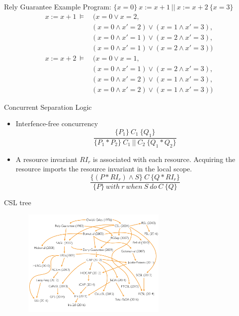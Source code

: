 \documentclass[11pt]{beamer}
\begin{document}
\begin{frame}{Rely Guarantee Example}
 Program: $\{x = 0\}~ x := x + 1 ~||~ x := x + 2 ~\{x = 3\}$ \\
    \pause
  \begin{equation}
    \begin{split}
      x := x + 1 ~\models &~(x = 0 \lor x = 2, \\
      &(x = 0 \land x' = 2) \lor (x = 1 \land x' = 3), \\
      &(x = 0 \land x'=1) \lor (x=2 \land x' = 3), \\
      &(x = 0 \land x' = 1) \lor (x = 2 \land x' = 3)) \nonumber
  \end{split}
  \end{equation}
  \pause
  \begin{equation}
    \begin{split}
      x := x + 2 ~\models &~(x = 0 \lor x = 1, \\
      &(x = 0 \land x' = 1) \lor (x = 2 \land x' = 3), \\
      &(x = 0 \land x'= 2) \lor (x=1 \land x' = 3), \\
      &(x = 0 \land x' = 2) \lor (x = 1 \land x' = 3)) \nonumber
  \end{split}
  \end{equation}
\end{frame}


\begin{frame}{Concurrent Separation Logic}
  \begin{itemize}
  \item Interfence-free concurrency
    $$\frac{\{P_1\}~C_1~\{Q_1\}}{\{P_1 \ast P_2\}~C_1~||~C_2 ~\{Q_1 \ast Q_2
    \}}$$
    \pause
  \item A resource invariant $RI_r$ is associated with each resource. Acquiring
    the resource imports the resource invariant in the local scope.
    $$\frac{\{(P \ast RI_r) \land S\}~C~\{Q \ast RI_r\}}{\{P\}~with~r~when~S~do~C~\{Q\}}$$
  \end{itemize}
\end{frame}

\begin{frame}{CSL tree}
  \begin{figure}
  	\includegraphics[width=20em,height=14em]{./images/CSL-Family-Tree.pdf}
  \end{figure}
\end{frame}
\end{document}
